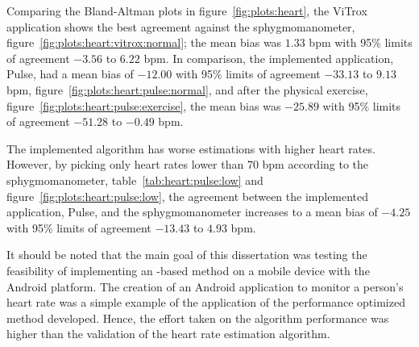 Comparing the Bland-Altman plots in figure~\ref{fig:plots:heart}, the ViTrox
application shows the best agreement against the sphygmomanometer,
figure~\ref{fig:plots:heart:vitrox:normal}; the mean bias was $1.33$ bpm
with 95\% limits of agreement $-3.56$ to $6.22$ bpm. In comparison,
the implemented application, Pulse, had a mean bias of $-12.00$ with
95\% limits of agreement $-33.13$ to $9.13$ bpm,
figure~\ref{fig:plots:heart:pulse:normal}, and after the physical exercise,
figure~\ref{fig:plots:heart:pulse:exercise}, the mean bias was $-25.89$
with 95\% limits of agreement $-51.28$ to $-0.49$ bpm.

The implemented algorithm has worse estimations with higher heart rates.
However, by picking only heart rates lower than 70 bpm according to the
sphygmomanometer, table~\ref{tab:heart:pulse:low} and
figure~\ref{fig:plots:heart:pulse:low}, the agreement between the
implemented application, Pulse, and the sphygmomanometer increases to
a mean bias of $-4.25$ with 95\% limits of agreement $-13.43$ to $4.93$ bpm.

It should be noted that the main goal of this dissertation was testing the
feasibility of implementing an \evm{}-based method on a mobile device with
the Android platform. The creation of an Android application to monitor
a person's heart rate was a simple example of the application of the
performance optimized \evm{} method developed.
Hence, the effort taken on the algorithm performance was higher than
the validation of the heart rate estimation algorithm.


